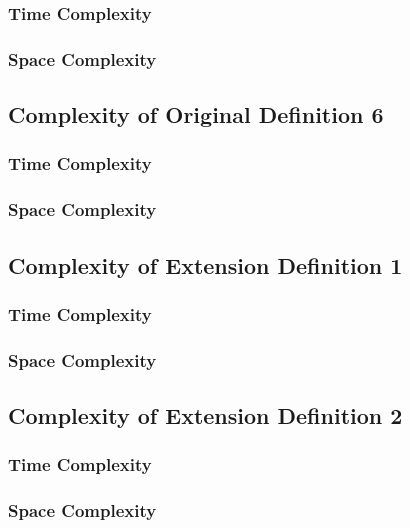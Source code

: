 \documentclass[conference]{IEEEtran}
\begin{document}
\subsubsection{Time Complexity}

\subsubsection{Space Complexity}

\subsection{Complexity of Original Definition 6}

\subsubsection{Time Complexity}

\subsubsection{Space Complexity}

\subsection{Complexity of Extension Definition 1}

\subsubsection{Time Complexity}

\subsubsection{Space Complexity}

\subsection{Complexity of Extension Definition 2}

\subsubsection{Time Complexity}

\subsubsection{Space Complexity}
\end{document}
